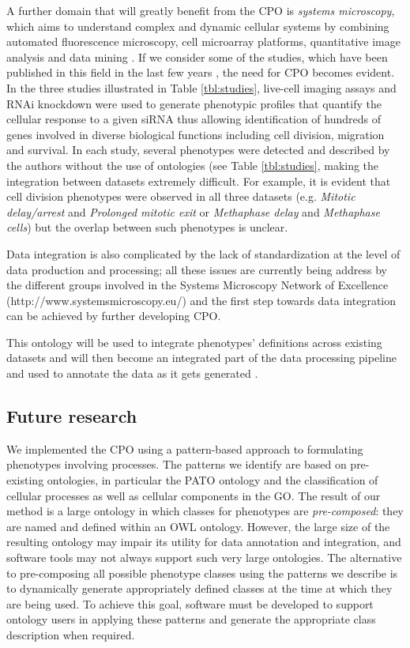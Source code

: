 \documentclass{bioinfo}
\renewcommand{\cite}{\citep}
\begin{document}
A further domain that will greatly benefit from the CPO is {\em
  systems microscopy}, which aims to understand complex and dynamic
cellular systems by combining automated fluorescence microscopy, cell
microarray platforms, quantitative image analysis and data mining
\cite{Lock2010}.  If we consider some of the studies, which have been
published in this field in the last few years \cite{Neumann2010,
  Schmitz2010, Fuchs2010}, the need for CPO becomes evident.  In the
three studies illustrated in Table \ref{tbl:studies}, live-cell
imaging assays and RNAi knockdown were used to generate phenotypic
profiles that quantify the cellular response to a given siRNA thus
allowing identification of hundreds of genes involved in diverse
biological functions including cell division, migration and survival.
In each study, several phenotypes were detected and described by the
authors without the use of ontologies (see Table \ref{tbl:studies},
making the integration between datasets extremely difficult. For
example, it is evident that cell division phenotypes were observed in
all three datasets (e.g. {\em Mitotic delay/arrest} and {\em Prolonged
  mitotic exit} or {\em Methaphase delay} and {\em Methaphase cells})
but the overlap between such phenotypes is unclear.

Data integration is also complicated by the lack of standardization at
the level of data production and processing; all these issues are
currently being address by the different groups involved in the
Systems Microscopy Network of Excellence
(http://www.systemsmicroscopy.eu/) and the first step towards data
integration can be achieved by further developing CPO.

This ontology will be used to integrate phenotypes' definitions across
existing datasets and will then become an integrated part of the data
processing pipeline and used to annotate the data as it gets generated
\cite{Conrad2011}.

\subsection{Future research}
We implemented the CPO using a pattern-based approach to formulating
phenotypes involving processes. The patterns we identify are based on
pre-existing ontologies, in particular the PATO ontology and the
classification of cellular processes as well as cellular components in
the GO. The result of our method is a large ontology in which classes
for phenotypes are {\em pre-composed}: they are named and defined
within an OWL ontology. However, the large size of the resulting
ontology may impair its utility for data annotation and integration,
and software tools may not always support such very large
ontologies. The alternative to pre-composing all possible phenotype
classes using the patterns we describe is to dynamically generate
appropriately defined classes at the time at which they are being
used. To achieve this goal, software must be developed to support
ontology users in applying these patterns and generate the appropriate
class description when required.
\end{document}

